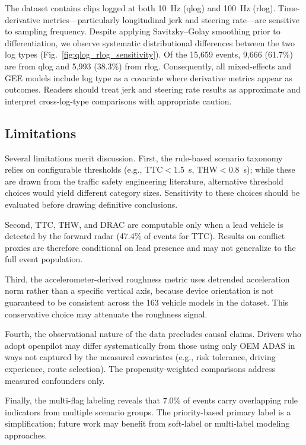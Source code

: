 The dataset contains clips logged at both 10~Hz (qlog) and 100~Hz (rlog). Time-derivative metrics---particularly longitudinal jerk and steering rate---are sensitive to sampling frequency. Despite applying Savitzky--Golay smoothing prior to differentiation, we observe systematic distributional differences between the two log types (Fig.~\ref{fig:qlog_rlog_sensitivity}). 
Of the 15,659 events, 9,666 (61.7\%) are from qlog and 5,993 (38.3\%) from rlog. 
Consequently, all mixed-effects and GEE models include log type as a covariate where derivative metrics appear as outcomes. Readers should treat jerk and steering rate results as approximate and interpret cross-log-type comparisons with appropriate caution.

\subsection{Limitations}
\label{subsec:limitations}

Several limitations merit discussion. First, the rule-based scenario taxonomy relies on configurable thresholds (e.g., TTC$<$\SI{1.5}{s}, THW$<$\SI{0.8}{s}); while these are drawn from the traffic safety engineering literature, alternative threshold choices would yield different category sizes. Sensitivity to these choices should be evaluated before drawing definitive conclusions.

Second, TTC, THW, and DRAC are computable only when a lead vehicle is detected by the forward radar (47.4\% of events for TTC). Results on conflict proxies are therefore conditional on lead presence and may not generalize to the full event population.

Third, the accelerometer-derived roughness metric uses detrended acceleration norm rather than a specific vertical axis, because device orientation is not guaranteed to be consistent across the 163 vehicle models in the dataset. This conservative choice may attenuate the roughness signal.

Fourth, the observational nature of the data precludes causal claims. Drivers who adopt openpilot may differ systematically from those using only OEM ADAS in ways not captured by the measured covariates (e.g., risk tolerance, driving experience, route selection). The propensity-weighted comparisons address measured confounders only.

Finally, the multi-flag labeling reveals that 7.0\% of events carry overlapping rule indicators from multiple scenario groups. The priority-based primary label is a simplification; future work may benefit from soft-label or multi-label modeling approaches.
